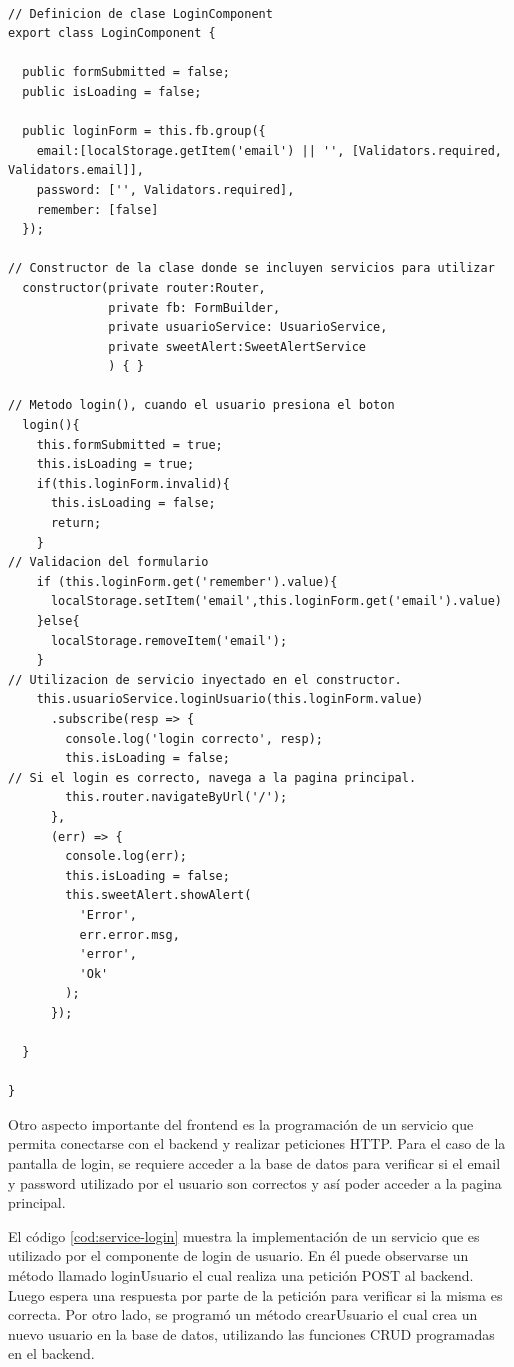 \begin{lstlisting}[label=cod:ts-login,caption=Fragmentos de código más relevantes utilizado en el archivo \textit{Typescript} del componente login.] 

// Definicion de clase LoginComponent
export class LoginComponent {

  public formSubmitted = false;
  public isLoading = false;

  public loginForm = this.fb.group({  
    email:[localStorage.getItem('email') || '', [Validators.required, Validators.email]],
    password: ['', Validators.required],
    remember: [false]
  });

// Constructor de la clase donde se incluyen servicios para utilizar
  constructor(private router:Router,
              private fb: FormBuilder,
              private usuarioService: UsuarioService,
              private sweetAlert:SweetAlertService
              ) { }
              
// Metodo login(), cuando el usuario presiona el boton
  login(){
    this.formSubmitted = true;
    this.isLoading = true;
    if(this.loginForm.invalid){
      this.isLoading = false;
      return;
    }
// Validacion del formulario 
    if (this.loginForm.get('remember').value){
      localStorage.setItem('email',this.loginForm.get('email').value)
    }else{
      localStorage.removeItem('email');
    }
// Utilizacion de servicio inyectado en el constructor.
    this.usuarioService.loginUsuario(this.loginForm.value)
      .subscribe(resp => {
        console.log('login correcto', resp);
        this.isLoading = false;
// Si el login es correcto, navega a la pagina principal. 
        this.router.navigateByUrl('/');
      },
      (err) => {
        console.log(err);
        this.isLoading = false;
        this.sweetAlert.showAlert(
          'Error',
          err.error.msg,
          'error',
          'Ok'
        );
      });
    
  }

}
\end{lstlisting} 

Otro aspecto importante del frontend es la programación de un servicio que permita conectarse con el backend y realizar peticiones HTTP. Para el caso de la pantalla de login,  se requiere acceder a la base de datos para verificar si el email y password utilizado por el usuario son correctos y así poder acceder a la pagina principal. 

El código \ref{cod:service-login} muestra la implementación de un servicio que es utilizado por el componente de login de usuario. En él puede observarse un método llamado loginUsuario el cual realiza una petición POST al backend.  Luego espera una respuesta por parte de la petición para verificar si la misma es correcta.  Por otro lado, se programó un método crearUsuario el cual crea un nuevo usuario en la base de datos, utilizando las funciones CRUD programadas en el backend. 

